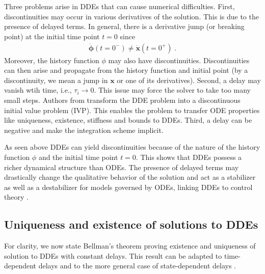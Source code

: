 Three problems arise in DDEs that can cause numerical difficulties. First, discontinuities may occur in various derivatives of the solution. This is due to the presence of delayed terms. In general, there is a derivative jump (or breaking point) at the initial time point $t=0$ since
%
\begin{equation*}
\begin{aligned}
    \dot{\mathbf{\phi}}(t=0^{-}) \neq  \dot{\mathbf{x}}(t=0^{+}) \; .
\end{aligned}
\end{equation*}
%
Moreover, the history function $\phi$ may also have discontinuities. Discontinuities can then arise and propagate from the history function and initial point (by a discontinuity, we mean a jump in $\boldsymbol{\mathbf{x}}$ or one of its derivatives).
Second, a delay may vanish wtih time, i.e., $\tau_i \rightarrow 0$. This issue may force the solver to take too many small steps. Authors from \citet{numerical_dde} transform the DDE problem into a discontinuous initial value problem (IVP). This enables the problem to transfer ODE properties like uniqueness, existence, stiffness and bounds to DDEs.
Third, a delay can be negative and make the integration scheme implicit. %

As seen above DDEs can yield discontinuities because of the nature of the history function $\phi$ and the initial time point $t=0$. This shows that DDEs possess a richer dynamical structure than ODEs. The presence of delayed terms may drastically change the qualitative behavior of the solution and act as a stabilizer as well as a destabilizer for models governed by ODEs, linking DDEs to control theory \citep{mg_control}. 

\subsection{Uniqueness and existence of solutions to DDEs}
For clarity, we now state Bellman's theorem proving existence and uniqueness of solution to DDEs with constant delays. This result can be adapted to time-dependent delays \citep{existence_general_delay} and to the more general case of state-dependent delays \citep{Driver1962}.

